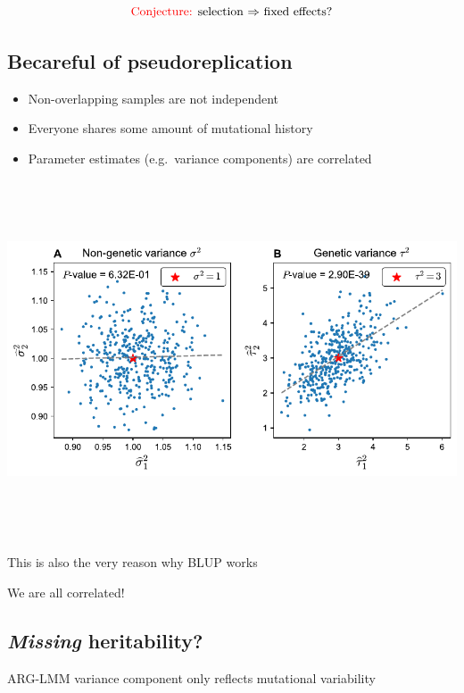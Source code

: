 \documentclass[
  letterpaper,
  DIV=11,
  numbers=noendperiod]{scrartcl}
\providecommand{\tightlist}{%
  \setlength{\itemsep}{0pt}\setlength{\parskip}{0pt}}\usepackage{longtable,booktabs,array}
\begin{document}
\[
    \text{\textcolor{red}{Conjecture:} selection $\Rightarrow$ fixed effects?}
\]

\subsection{Becareful of
pseudoreplication}\label{becareful-of-pseudoreplication}

\begin{itemize}
\tightlist
\item
  Non-overlapping samples are not independent
\item
  Everyone shares some amount of mutational history
\item
  Parameter estimates (e.g.~variance components) are correlated
\end{itemize}

\begin{center}
\includegraphics[width=\linewidth,height=4.16667in,keepaspectratio]{slides_files/mediabag/imgs/pseudoreplication.pdf}
\end{center}

This is also the very reason why BLUP works

We are all correlated!

\subsection{\texorpdfstring{\emph{Missing}
heritability?}{Missing heritability?}}\label{missing-heritability}

ARG-LMM variance component only reflects mutational variability
\end{document}
